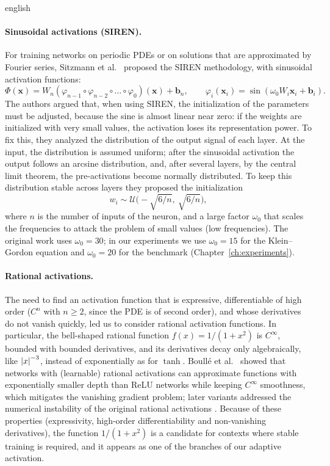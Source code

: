 \begin{hyphenrules}{english}
\paragraph{Sinusoidal activations (SIREN).}
For training networks on periodic PDEs or on solutions that are approximated by Fourier series,
Sitzmann et al.~\cite{sitzmann2020} proposed the SIREN methodology, with sinusoidal activation functions:
\begin{equation}
  \Phi(\mathbf{x})=W_n(\varphi_{n-1}\circ\varphi_{n-2}\circ\dots\circ\varphi_0)(\mathbf{x})+\mathbf{b}_n,\qquad
  \varphi_i(\mathbf{x}_i)=\sin(\omega_0W_i\mathbf{x}_i+\mathbf{b}_i).
  \label{eq:siren}
\end{equation}
The authors argued that, when using SIREN, the initialization of the parameters must be adjusted, because
the sine is almost linear near zero: if the weights are initialized with very small values, the activation
loses its representation power. To fix this, they analyzed the distribution of the output signal of each
layer. At the input, the distribution is assumed uniform; after the sinusoidal activation the output
follows an arcsine distribution, and, after several layers, by the central limit theorem, the
pre-activations become normally distributed. To keep this distribution stable across layers they proposed
the initialization
\begin{equation}
  w_i\sim\mathcal{U}\Big(-\sqrt{6/n},\ \sqrt{6/n}\Big),
  \label{eq:siren-init}
\end{equation}
where $n$ is the number of inputs of the neuron, and a large factor $\omega_0$ that scales the frequencies
to attack the problem of small values (low frequencies). The original work uses $\omega_0=30$; in our
experiments we use $\omega_0=15$ for the Klein--Gordon equation and $\omega_0=20$ for the benchmark
(Chapter~\ref{ch:experiments}).

\paragraph{Rational activations.}
The need to find an activation function that is expressive, differentiable of high order ($C^n$ with
$n\ge2$, since the PDE is of second order), and whose derivatives do not vanish quickly, led us to
consider rational activation functions. In particular, the bell-shaped rational function
$f(x)=1/(1+x^2)$ is $C^\infty$, bounded with bounded derivatives, and its derivatives decay only
algebraically, like $\left\lvert x \right\rvert^{-3}$, instead of exponentially as for $\tanh$. Boull{\'e} et al.~\cite{boulle2020} showed
that networks with (learnable) rational activations can approximate functions with exponentially smaller
depth than ReLU networks while keeping $C^\infty$ smoothness, which mitigates the vanishing gradient
problem; later variants addressed the numerical instability of the original rational activations
\cite{dubey2022}. Because of these properties (expressivity, high-order differentiability and
non-vanishing derivatives), the function $1/(1+x^2)$ is a candidate for contexts where stable training is
required, and it appears as one of the branches of our adaptive activation.


\end{hyphenrules}
